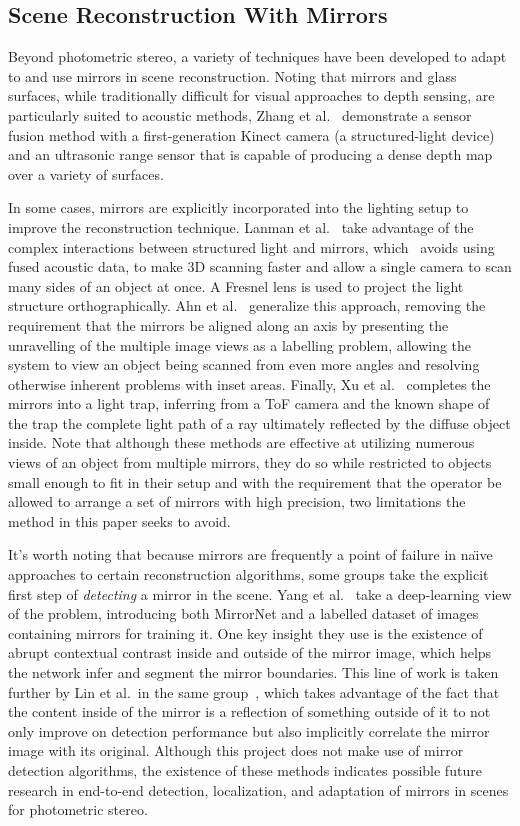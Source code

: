 \subsection{Scene Reconstruction With Mirrors}
Beyond photometric stereo, a variety of techniques have been developed to adapt
to and use mirrors in scene reconstruction. Noting that mirrors and glass
surfaces, while traditionally difficult for visual approaches to depth sensing,
are particularly suited to acoustic methods, Zhang et al.~\cite{zhang}
demonstrate a sensor fusion method with a first-generation Kinect camera (a
structured-light device) and an ultrasonic range sensor that is capable of
producing a dense depth map over a variety of surfaces.

In some cases, mirrors are explicitly incorporated into the lighting setup to
improve the reconstruction technique. Lanman et al.~\cite{lanman} take
advantage of the complex interactions between structured light and mirrors,
which~\cite{zhang} avoids using fused acoustic data, to make 3D scanning faster
and allow a single camera to scan many sides of an object at once. A Fresnel
lens is used to project the light structure orthographically. Ahn et
al.~\cite{ahn} generalize this approach, removing the requirement that the
mirrors be aligned along an axis by presenting the unravelling of the multiple
image views as a labelling problem, allowing the system to view an object being
scanned from even more angles and resolving otherwise inherent problems with
inset areas. Finally, Xu et al.~\cite{xu} completes the mirrors into a light
trap, inferring from a ToF camera and the known shape of the trap the complete
light path of a ray ultimately reflected by the diffuse object inside. Note
that although these methods are effective at utilizing numerous views of an
object from multiple mirrors, they do so while restricted to objects small
enough to fit in their setup and with the requirement that the operator be
allowed to arrange a set of mirrors with high precision, two limitations the
method in this paper seeks to avoid.

It's worth noting that because mirrors are frequently a point of failure in
na\"{\i}ve approaches to certain reconstruction algorithms, some groups take
the explicit first step of \emph{detecting} a mirror in the scene. Yang et
al.~\cite{yang} take a deep-learning view of the problem, introducing both
MirrorNet and a labelled dataset of images containing mirrors for training it.
One key insight they use is the existence of abrupt contextual contrast inside
and outside of the mirror image, which helps the network infer and segment the
mirror boundaries. This line of work is taken further by Lin et al.\ in the
same group~\cite{lin}, which takes advantage of the fact that the content
inside of the mirror is a reflection of something outside of it to not only
improve on detection performance but also implicitly correlate the mirror image
with its original.  Although this project does not make use of mirror detection
algorithms, the existence of these methods indicates possible future research
in end-to-end detection, localization, and adaptation of mirrors in scenes for
photometric stereo.

